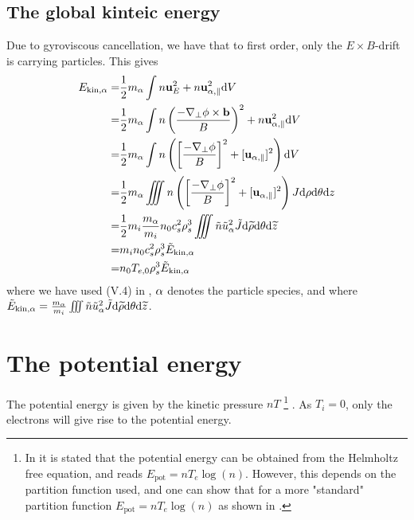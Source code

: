 \subsection{The global kinteic energy}
%
Due to gyroviscous cancellation, we have that to first order, only the $E\times B$-drift is carrying particles.
This gives
%
\begin{align*}
    E_{\text{kin},\alpha}
    =& \frac{1}{2}m_{\alpha}\int
       n\mathbf{u}_E^2
       + n\mathbf{u}_{\alpha,\parallel}^2 \text{d} V
     \\
    =& \frac{1}{2}m_{\alpha}\int
       n\left(\frac{-\nabla_\perp\phi
              \times\mathbf{b}}{B}\right)^2
       + n\mathbf{u}_{\alpha,\parallel}^2 \text{d} V
    \\
    =& \frac{1}{2}m_{\alpha}\int
       n\left(\left[\frac{-\nabla_\perp\phi}{B}\right]^2
       + [\mathbf{u}_{\alpha,\parallel}]^2\right) \text{d} V
   \\
    =& \frac{1}{2}m_{\alpha}\iiint
       n\left(\left[\frac{-\nabla_\perp\phi}{B}\right]^2
       + [\mathbf{u}_{\alpha,\parallel}]^2\right)
       J \text{d}\rho \text{d}\theta \text{d} z
    \\
    =& \frac{1}{2}m_i\frac{m_{\alpha}}{m_i}
       n_0c_s^2\rho_s^3
       \iiint
       \tilde{n}\tilde{u}_\alpha^2
       \tilde{J} \text{d} \widetilde{ \rho} \text{d}\theta \text{d} \widetilde{ z}
    \\
    =& m_in_0c_s^2\rho_s^3 \tilde{E}_{\text{kin},\alpha}
    \\
    =& n_0T_{e,0}\rho_s^3 \tilde{E}_{\text{kin},\alpha}
\end{align*}
%
where we have used (V.4) in \cite{Dhaeseleer1991book}, $\alpha$ denotes the particle species, and where $\tilde{E}_{\text{kin},\alpha} = \frac{m_{\alpha}}{m_i}\iiint \tilde{n}\tilde{u}_\alpha^2 \tilde{J} \text{d} \widetilde{ \rho} \text{d}\theta \text{d} \widetilde{ z}$.

%
\section{The potential energy}
%
The potential energy is given by the kinetic pressure $nT$
%
\footnote{In \cite{Wiesenberger2014} it is stated that the potential energy can be obtained from the Helmholtz free equation, and reads $E_{\text{pot}}=nT_e\log(n)$.
    However, this depends on the partition function used, and one can show that for a more "standard" partition function $E_{\text{pot}}=nT_e\log(n)$ as shown in \cite{Kittel1980book}.}%
.
As $T_i=0$, only the electrons will give rise to the potential energy.

